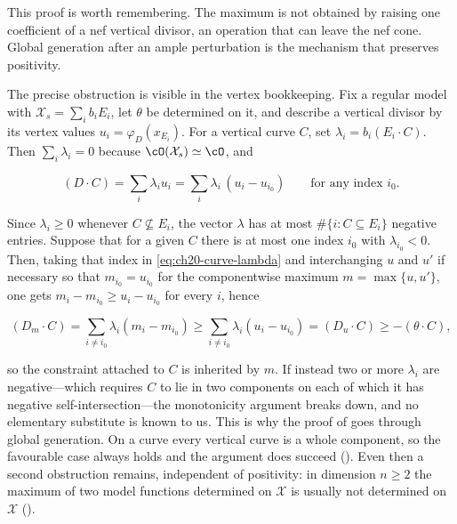 \begin{remark}
\label{rem:ch20-why-max-is-hard}
This proof is worth remembering.  The maximum is not obtained by raising
one coefficient of a nef vertical divisor, an operation that can leave the
nef cone.  Global generation after an ample perturbation is the mechanism
that preserves positivity.

The precise obstruction is visible in the vertex bookkeeping.  Fix a regular
model with \(\mathcal X_s=\sum_ib_iE_i\), let \(\theta\) be determined on
it, and describe a vertical divisor by its vertex values
\(u_i=\varphi_D(x_{E_i})\).  For a vertical curve \(C\), set
\(\lambda_i=b_i(E_i\cdot C)\).  Then \(\sum_i\lambda_i=0\) because
\(\cO(\mathcal X_s)\simeq\cO\), and

\begin{equation}
\label{eq:ch20-curve-lambda}
 (D\cdot C)=\sum_i\lambda_iu_i
 =\sum_{i}\lambda_i\,(u_i-u_{i_0})
 \qquad\text{for any index }i_0 .
\end{equation}

Since \(\lambda_i\geq0\) whenever \(C\not\subseteq E_i\), the vector
\(\lambda\) has at most \(\#\{i:C\subseteq E_i\}\) negative entries.  Suppose
that for a given \(C\) there is at most one index \(i_0\) with
\(\lambda_{i_0}<0\).  Then, taking that index in
\eqref{eq:ch20-curve-lambda} and interchanging \(u\) and \(u'\) if
necessary so that \(m_{i_0}=u_{i_0}\) for the componentwise maximum
\(m=\max\{u,u'\}\), one gets \(m_i-m_{i_0}\geq u_i-u_{i_0}\) for every
\(i\), hence

\[
 (D_m\cdot C)=\sum_{i\ne i_0}\lambda_i(m_i-m_{i_0})
 \geq\sum_{i\ne i_0}\lambda_i(u_i-u_{i_0})=(D_u\cdot C)
 \geq-(\theta\cdot C),
\]

so the constraint attached to \(C\) is inherited by \(m\).  If instead two or
more \(\lambda_i\) are negative---which requires \(C\) to lie in two
components on each of which it has negative self-intersection---the
monotonicity argument breaks down, and no elementary substitute is known to
us.  This is why the proof of  goes through global
generation.  On a curve every vertical curve is a whole component, so the
favourable case always holds and the argument does succeed
().  Even then a second obstruction remains,
independent of positivity: in dimension \(n\ge2\) the maximum of two model
functions determined on \(\mathcal X\) is usually not determined on
\(\mathcal X\) ().
\end{remark}

